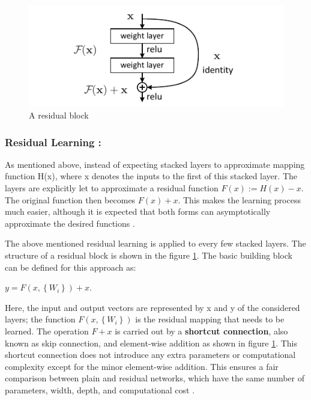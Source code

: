 \begin{figure}[ht!]
    \centering
    \includegraphics[width=1.2\linewidth]{Rohit_Master_Thesis//Images/residual_block.pdf}
    \caption{A residual block \cite{he2016deep}}
    \label{fig:residual block}
\end{figure}

\subsubsection*{Residual Learning :}

As mentioned above, instead of expecting stacked layers to approximate mapping function H(x), where x denotes the inputs to the first of this stacked layer. The layers are explicitly let to approximate a residual function $F(x) := H(x) - x$. The original function then becomes $F(x) + x$. This makes the learning process much easier, although it is expected that both forms can asymptotically approximate the desired functions \cite{he2016deep}.

The above mentioned residual learning is applied to every few stacked layers. The structure of a residual block is shown in the figure \ref{fig:residual block}. The basic building block can be defined for this approach as:

$ y = F(x, \left\{ W_{i}\right\}) + x$.

Here, the input and output vectors are represented by x and y of the considered layers; the function $F(x, \left\{ W_{i}\right\})$  is the residual mapping that needs to be learned. The operation $F + x$ is carried out by a \textbf{shortcut connection}, also known as skip connection, and element-wise addition as shown in figure \ref{fig:residual block}. This shortcut connection does not introduce any extra parameters or computational complexity except for the minor element-wise addition. This ensures a fair comparison between plain and residual networks, which have the same number of parameters, width, depth, and computational cost \cite{he2016deep}.

